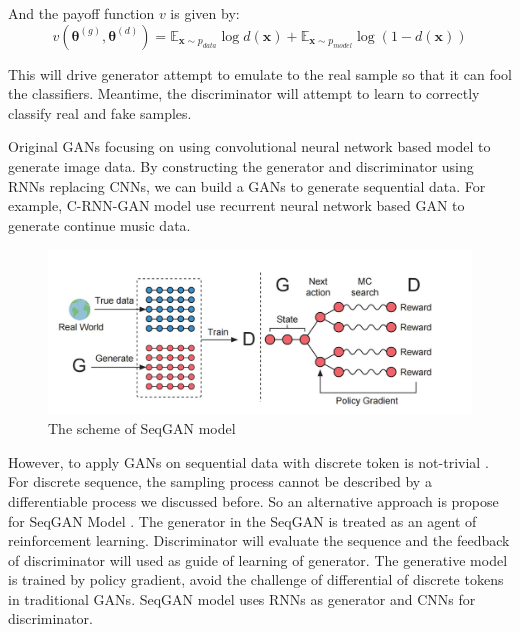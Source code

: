 And the payoff function $ v $ is given by:
\[ v(\bm{\theta}^{(g)}, \bm{\theta}^{(d)}) = \mathbb{E}_{\mathbf{x}\sim p_{\textit{data}}}\log d(\bm{x})+ \mathbb{E}_{\mathbf{x}\sim p_{\textit{model}}}\log (1- d(\bm{x}))\]

This will drive generator attempt to emulate to the real sample so that it can fool the classifiers. Meantime, the discriminator will attempt to learn to correctly classify real and fake samples.

Original GANs focusing on using convolutional neural network based model to generate image data. By constructing the generator and discriminator using RNNs replacing CNNs, we can build a GANs to generate sequential data. For example, C-RNN-GAN model \cite{mogren2016crnngan} use recurrent neural network based GAN to generate continue music data. 

\begin{figure}[htbp]
	\centering
	\includegraphics[width=0.9\linewidth]{SwqGAN.jpg}
	\caption{The scheme of SeqGAN model}
	\label{fig:seqGAN}
\end{figure}

However, to apply GANs on sequential data with discrete token is not-trivial \cite{huszar2015}. For discrete sequence, the sampling process cannot be described by a differentiable process we discussed before. So an alternative approach is propose for SeqGAN Model \cite{yu2016seqgan}. The generator in the SeqGAN is treated as an agent of reinforcement learning. Discriminator will evaluate the sequence and the feedback of discriminator will used as guide of learning of generator. The generative model is trained by policy gradient, avoid the challenge of differential of discrete tokens in traditional GANs. SeqGAN model uses RNNs as generator and CNNs for discriminator.
